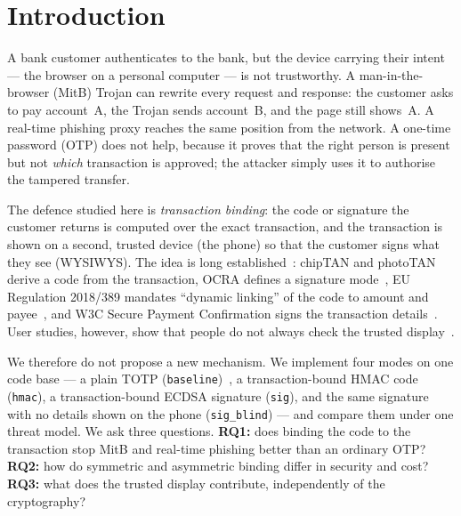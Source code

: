 \begin{abstract}
\noindent
Malware in the browser can change the recipient or amount of a bank transfer
while the screen still shows what the user typed; an ordinary one-time password
does not stop this. We build a demo bank with four interchangeable
authentication modes --- \texttt{baseline} (TOTP), \texttt{hmac} (a code over the
exact transaction), \texttt{sig} (an ECDSA signature over it) and
\texttt{sig\_blind} (the same signature with no phone display) --- and compare
them under one threat model with an automated harness of 14 attack-scenario
variants. Transaction binding blocks the tampering that \texttt{baseline} lets
through; signatures additionally survive a database leak and give
third-party--verifiable evidence; and blind signing shows that strong
cryptography fails without a trusted display.
\end{abstract}

\section{Introduction}\label{sec:main-intro}
A bank customer authenticates to the bank, but the device carrying their intent
--- the browser on a personal computer --- is not trustworthy. A
man-in-the-browser (MitB) Trojan can rewrite every request and response: the
customer asks to pay account~A, the Trojan sends account~B, and the page still
shows~A. A real-time phishing proxy reaches the same position from the network.
A one-time password (OTP) does not help, because it proves that the right person
is present but not \emph{which} transaction is approved; the attacker simply
uses it to authorise the tampered transfer.

The defence studied here is \emph{transaction binding}: the code or signature the
customer returns is computed over the exact transaction, and the transaction is
shown on a second, trusted device (the phone) so that the customer signs what
they see (WYSIWYS). The idea is long established~\cite{hiltgen2006,ztic2008}:
chipTAN and photoTAN derive a code from the transaction, OCRA defines a signature
mode~\cite{rfc6287}, EU Regulation 2018/389 mandates ``dynamic linking'' of the
code to amount and payee~\cite{eu2018389}, and W3C Secure Payment Confirmation
signs the transaction details~\cite{w3cspc}. User studies, however, show that
people do not always check the trusted display~\cite{alzomai2008,haupert2019}.

We therefore do not propose a new mechanism. We implement four modes on one code
base --- a plain TOTP (\texttt{baseline})~\cite{rfc4226,rfc6238}, a
transaction-bound HMAC code (\texttt{hmac}), a transaction-bound ECDSA signature
(\texttt{sig}), and the same signature with no details shown on the phone
(\texttt{sig\_blind}) --- and compare them under one threat model. We ask three
questions. \textbf{RQ1:} does binding the code to the transaction stop MitB and
real-time phishing better than an ordinary OTP? \textbf{RQ2:} how do symmetric
and asymmetric binding differ in security and cost? \textbf{RQ3:} what does the
trusted display contribute, independently of the cryptography?

